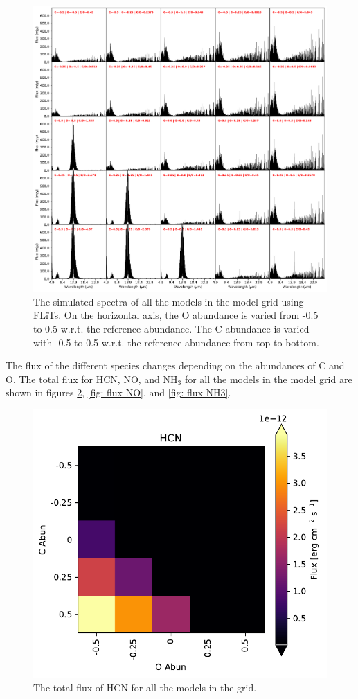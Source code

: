 \documentclass[twoside, single, authoryear, semicolon]{lion-msc}
\newcommand{\4}{$_4$}
\newcommand{\3}{$_3$}
\newcommand{\2}{$_2$}
\begin{document}
\begin{figure}[!ht]
    \centering
    \includegraphics[width=\linewidth]{Figures/All_spectra.pdf}
    \caption{The simulated spectra of all the models in the model grid using FLiTs. On the horizontal axis, the O abundance is varied from -0.5 to 0.5 w.r.t. the reference abundance. The C abundance is varied with -0.5 to 0.5 w.r.t. the reference abundance from top to bottom.}
    \label{fig: all spectra}
\end{figure}

The flux of the different species changes depending on the abundances of C and O. The total flux for HCN, NO, and NH\3 for all the models in the model grid are shown in figures \ref{fig: flux HCN}, \ref{fig: flux NO}, and \ref{fig: flux NH3}. 

\begin{figure}[!ht]
    \centering
    \includegraphics[width=0.5\linewidth]{Figures/HCN_heatmap.pdf}
    \caption{The total flux of HCN for all the models in the grid.}
    \label{fig: flux HCN}
\end{figure}
\end{document}
